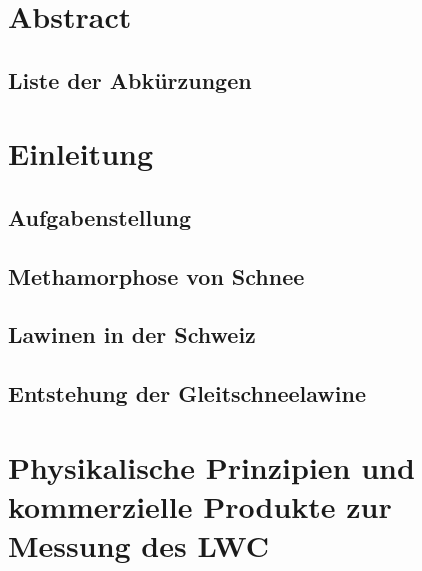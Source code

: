 \documentclass[a4paper,12pt]{article}
\begin{document}
\begin{titlepage}
  \end{titlepage}



\pagestyle{empty}
\section*{Abstract}


\newpage
\subsection*{Liste der Abkürzungen}

\newpage
\tableofcontents
\newpage
\pagestyle{fancy}

\setcounter{page}{1}
\section{Einleitung}


\subsection{Aufgabenstellung}


\subsection{Methamorphose von Schnee}


\subsection{Lawinen in der Schweiz}


\subsection{Entstehung der Gleitschneelawine}


%

\section{Physikalische Prinzipien und kommerzielle Produkte zur Messung des LWC}

\newpage
\end{document}
